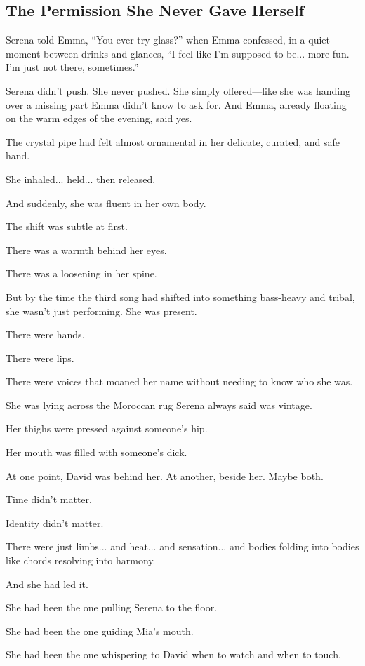 
\subsection{The Permission She Never Gave Herself}

Serena told Emma, “You ever try glass?” when Emma confessed, in a quiet moment between 
drinks and glances,
“I feel like I’m supposed to be... more fun. I’m just not there, sometimes.”

Serena didn’t push. She never pushed. She simply offered—like she was handing over a 
missing part Emma 
didn’t know to ask for.  And Emma, already floating on the warm edges of the evening, 
said yes.

The crystal pipe had felt almost ornamental in her delicate, curated, and safe hand.

She inhaled... held... then released.

And suddenly, she was fluent in her own body.

The shift was subtle at first. 

There was a warmth behind her eyes. 

There was a loosening in her spine. 

But by the time the third song had shifted into something bass-heavy and tribal, she 
wasn’t just performing. 
She was present.

There were hands. 

There were lips. 

There were voices that moaned her name without needing to know who she was.

She was lying across the Moroccan rug Serena always said was vintage. 

Her thighs were pressed against someone’s hip. 

Her mouth was filled with someone's dick.

At one point, David was behind her. At another, beside her. Maybe 
both. 

Time didn’t matter. 

Identity didn’t matter. 

There were just limbs... and heat... and sensation... and bodies folding 
into bodies like chords resolving into harmony.

And she had led it.

She had been the one pulling Serena to the floor. 

She had been the one guiding Mia’s mouth.

She had been the one whispering to David when to watch and when to touch.


